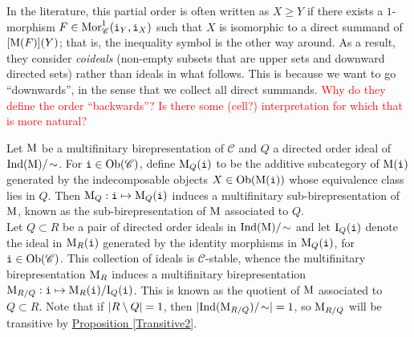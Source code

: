 \noindent\begin{remark} In the literature, this partial order is often written as $X \geq Y$ if there exists a $1$-morphism $F \in \textnormal{Mor}_\mathscr{C}^1(\textnormal{\texttt{i}}_Y, \textnormal{\texttt{i}}_X)$ such that $X$ is isomorphic to a direct summand of $[\textnormal{M}(F)](Y)$; that is, the inequality symbol is the other way around. As a result, they consider {\em coideals} (non-empty subsets that are upper sets and downward directed sets) rather than ideals in what follows. This is because we want to go ``downwards'', in the sense that we collect all direct summands. \textcolor{red}{Why do they define the order ``backwards''? Is there some (cell?) interpretation for which that is more natural?}\\
\end{remark}


\noindent Let $\textnormal{M}$ be a multifinitary birepresentation of $\mathscr{C}$ and $Q$ a directed order ideal of $\textnormal{Ind}(\textnormal{M})/\!\sim$. For $\textnormal{\texttt{i}} \in \textnormal{Ob}(\mathscr{C})$, define $\textnormal{M}_Q(\textnormal{\texttt{i}})$ to be the additive subcategory of $\textnormal{M}(\textnormal{\texttt{i}})$ generated by the indecomposable objects $X \in \textnormal{Ob}(\textnormal{M}(\textnormal{\texttt{i}}))$ whose equivalence class lies in $Q$. Then $\textnormal{M}_Q : \textnormal{\texttt{i}} \mapsto \textnormal{M}_Q(\textnormal{\texttt{i}})$ induces a multifinitary sub-birepresentation of $\textnormal{M}$, known as the sub-birepresentation of $\textnormal{M}$ associated to $Q$.\\

\noindent Let $Q \subset R$ be a pair of directed order ideals in $\textnormal{Ind}(\textnormal{M})/\!\sim$ and let $\textnormal{I}_Q(\textnormal{\texttt{i}})$ denote the ideal in $\textnormal{M}_R(\textnormal{\texttt{i}})$ generated by the identity morphisms in $\textnormal{M}_Q(\textnormal{\texttt{i}})$, for $\textnormal{\texttt{i}} \in \textnormal{Ob}(\mathscr{C})$. This collection of ideals is $\mathscr{C}$-stable, whence the multifinitary birepresentation $\textnormal{M}_R$ induces a multifinitary birepresentation $\textnormal{M}_{R/Q} : \textnormal{\texttt{i}} \mapsto \textnormal{M}_R(\textnormal{\texttt{i}})/\textnormal{I}_Q(\textnormal{\texttt{i}})$. This is known as the quotient of $\textnormal{M}$ associated to $Q \subset R$. Note that if $\lvert R \setminus Q\rvert = 1$, then $\lvert\textnormal{Ind}(\textnormal{M}_{R/Q})/\!\sim\rvert = 1$, so $\textnormal{M}_{R/Q}$ will be transitive by \hyperref[Transitive2]{Proposition \ref*{Transitive2}}.\\

